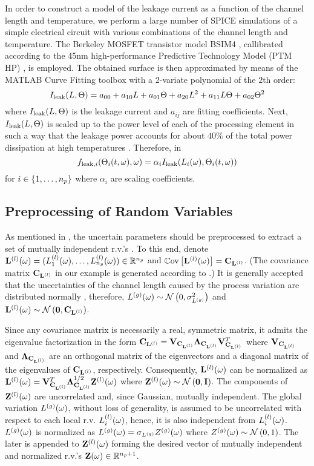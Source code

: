 In order to construct a model of the leakage current as a function of the channel length and temperature, we perform a large number of SPICE simulations of a simple electrical circuit with various combinations of the channel length and temperature. The Berkeley MOSFET transistor model BSIM4 \cite{bsim4}, callibrated according to the 45nm high-performance Predictive Technology Model (PTM HP) \cite{ptm}, is employed. The obtained surface is then approximated by means of the MATLAB Curve Fitting toolbox \cite{matlab} with a 2-variate polynomial of the $2$th order:
\[
  I_{\text{leak}}(L, \Theta) = a_{00} + a_{10} L + a_{01} \Theta + a_{20} L^2 + a_{11} L \Theta + a_{02} \Theta^2
\]
where $I_{\text{leak}}(L, \Theta)$ is the leakage current and $a_{ij}$ are fitting coefficients. Next, $I_{\text{leak}}(L, \Theta)$ is scaled up to the power level of each of the processing element in such a way that the leakage power accounts for about $40\%$ of the total power dissipation at high temperatures \cite{liu2007}. Therefore, in 
\[
  f_{\text{leak}, i}(\Theta_i(t, \omega), \omega) = \alpha_i I_{\text{leak}}(L_i(\omega), \Theta_i(t, \omega))
\]
for $i \in \{ 1, \dotsc, {n_p} \}$ where $\alpha_i$ are scaling coefficients.

\subsection{Preprocessing of Random Variables} 
As mentioned in , the uncertain parameters should be preprocessed to extract a set of mutually independent r.v.'s \cite{xiu2009}. To this end, denote $\vlLeff(\o) = \vec{\lLeff_1(\o), \dotsc, \lLeff_\cores(\o)} \in \real^\cores$ and $\oCov{\vlLeff(\o)} = \mCov_\vlLeff$. (The covariance matrix $\mCov_\vlLeff$ in our example is generated according to .) It is generally accepted that the uncertainties of the channel length caused by the process variation are distributed normally \cite{srivastava2010, liu2007, juan2012}, therefore, ${L^{(g)}}(\omega) \sim \mathcal{N}\left( 0, \sigma^2_{L^{(g)}} \right)$ and $\vlLeff(\o) \sim \normal{\vZero}{\mCov_\vlLeff}$.

Since any covariance matrix is necessarily a real, symmetric matrix, it admits the eigenvalue factorization \cite{press2007} in the form $\mCov_\vlLeff = \m{V}_{\mCov_\vlLeff} \m{\Lambda}_{\mCov_\vlLeff} \m{V}_{\mCov_\vlLeff}^T$ where $\m{V}_{\mCov_\vlLeff}$ and $\m{\Lambda}_{\mCov_\vlLeff}$ are an orthogonal matrix of the eigenvectors and a diagonal matrix of the eigenvalues of $\mCov_\vlLeff$, respectively. Consequently, $\vlLeff(\o)$ can be normalized as $\vlLeff(\o) = \m{V}_{\mCov_\vlLeff}^T \m{\Lambda}_{\mCov_\vlLeff}^\ifrac{1}{2} \vlZ(\o)$ where $\vlZ(\o) \sim \normal{\vZero}{\mI}$. The components of ${\mathbf{Z}^{(l)}}(\omega)$ are uncorrelated and, since Gaussian, mutually independent. The global variation ${L^{(g)}}(\omega)$, without loss of generality, is assumed to be uncorrelated with respect to each local r.v. $L^{(l)}_i(\omega)$, hence, it is also independent from $L^{(l)}_i(\omega)$. ${L^{(g)}}(\omega)$ is normalized as ${L^{(g)}}(\omega) = \sigma_{L^{(g)}} {Z^{(g)}}(\omega)$ where ${Z^{(g)}}(\omega) \sim \mathcal{N}\left( 0, 1 \right)$. The later is appended to ${\mathbf{Z}^{(l)}}(\omega)$ forming the desired vector of mutually independent and normalized r.v.'s $\mathbf{Z}(\omega) \in \mathbb{R}^{{n_p} + 1}$.

